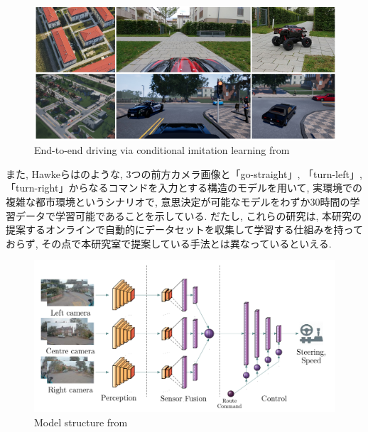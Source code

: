 \vspace{0.5cm}

\begin{figure}[hbtp]
     \centering
    \includegraphics[keepaspectratio, scale=0.57]
         {images/felipe.png}
    \caption{End-to-end driving via conditional imitation learning from \cite{felipe}}
    \label{Fig:felipe}
\end{figure}

\newpage

また, Hawkeら\cite{hawke}はのような, 3つの前方カメラ画像と「go-straight」, 「turn-left」, 「turn-right」からなるコマンドを入力とする構造のモデルを用いて, 実環境での複雑な都市環境というシナリオで, 意思決定が可能なモデルをわずか30時間の学習データで学習可能であることを示している.
だたし, これらの研究は, 本研究の提案するオンラインで自動的にデータセットを収集して学習する仕組みを持っておらず, その点で本研究室で提案している手法とは異なっているといえる.

\vspace{3cm}

\begin{figure}[hbtp]
     \centering
    \includegraphics[keepaspectratio, scale=0.3]
         {images/hawke.png}
    \caption{Model structure from \cite{hawke}}
    \label{Fig:hawke}
\end{figure}

\newpage